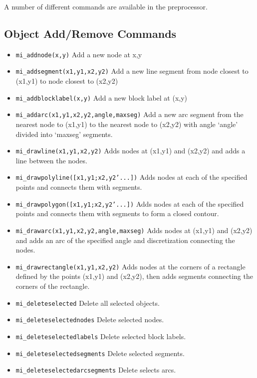 A number of different commands are available in the preprocessor.

\subsection{Object Add/Remove Commands}

\begin{itemize}

\item{\tt mi\_addnode(x,y)} Add a new node at x,y

\item{\tt mi\_addsegment(x1,y1,x2,y2)} Add a new line segment from node
closest to (x1,y1) to node closest to (x2,y2)

\item{\tt mi\_addblocklabel(x,y)} Add a new block label at (x,y)

\item{\tt mi\_addarc(x1,y1,x2,y2,angle,maxseg)} Add a new arc segment
from the nearest node to (x1,y1) to the nearest node to (x2,y2)
with angle `angle' divided into `maxseg' segments.

\item{\tt mi\_drawline(x1,y1,x2,y2)} Adds nodes at (x1,y1) and
(x2,y2) and adds a line between the nodes.

\item{\tt mi\_drawpolyline([x1,y1;x2,y2'...])} Adds nodes at each
of the specified points and connects them with segments.

\item{\tt mi\_drawpolygon([x1,y1;x2,y2'...])} Adds nodes at each
of the specified points and connects them with segments to form a
closed contour.

\item{\tt mi\_drawarc(x1,y1,x2,y2,angle,maxseg)} Adds nodes at
(x1,y1) and (x2,y2) and adds an arc of the specified angle and
discretization connecting the nodes.

\item{\tt mi\_drawrectangle(x1,y1,x2,y2)} Adds nodes at the
corners of a rectangle defined by the points (x1,y1) and (x2,y2),
then adds segments connecting the corners of the rectangle.

\item{\tt mi\_deleteselected} Delete all selected objects.

\item{\tt mi\_deleteselectednodes} Delete selected nodes.

\item{\tt mi\_deleteselectedlabels} Delete selected block labels.

\item{\tt mi\_deleteselectedsegments} Delete selected segments.

\item{\tt mi\_deleteselectedarcsegments} Delete selects arcs.
\end{itemize}

